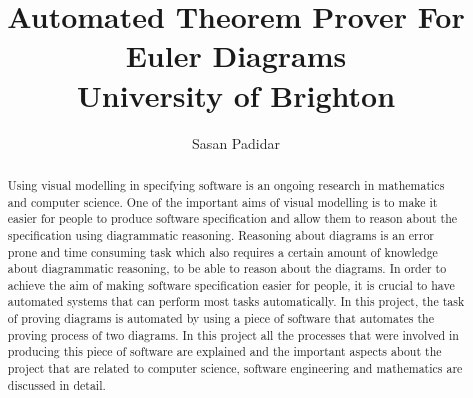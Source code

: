 \documentclass[10pt, a4paper, titlepage]{article}
\title{Automated Theorem Prover For Euler Diagrams \\ University of Brighton}
\author{Sasan Padidar}
\begin{document}
	

\maketitle

\begin{abstract}
Using visual modelling in specifying software is an ongoing research in mathematics and computer science. One of the important aims of visual modelling is to make it easier for people to produce software specification and allow them to reason about the specification using diagrammatic reasoning. Reasoning about diagrams is an error prone and time consuming task which also requires a certain amount of knowledge about diagrammatic reasoning, to be able to reason about the diagrams. In order to achieve the aim of making software specification easier for people, it is crucial to have automated systems that can perform most tasks automatically. In this project, the task of proving diagrams is automated by using a piece of software that automates the proving process of two diagrams. In this project all the processes that were involved in producing this piece of software are explained and the important aspects about the project that are related to computer science, software engineering and mathematics are discussed in detail. 
\end{abstract}
\newpage
\end{document}
